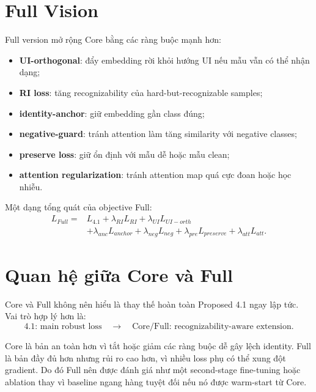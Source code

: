 \documentclass[13pt,a4paper]{extreport}
\begin{document}
\section{Full Vision}
Full version mở rộng Core bằng các ràng buộc mạnh hơn:
\begin{itemize}[leftmargin=1.2cm]
    \item \textbf{UI-orthogonal}: đẩy embedding rời khỏi hướng UI nếu mẫu vẫn có thể nhận dạng;
    \item \textbf{RI loss}: tăng recognizability của hard-but-recognizable samples;
    \item \textbf{identity-anchor}: giữ embedding gần class đúng;
    \item \textbf{negative-guard}: tránh attention làm tăng similarity với negative classes;
    \item \textbf{preserve loss}: giữ ổn định với mẫu dễ hoặc mẫu clean;
    \item \textbf{attention regularization}: tránh attention map quá cực đoan hoặc học nhiễu.
\end{itemize}

Một dạng tổng quát của objective Full:
\begin{equation}
\begin{aligned}
    L_{Full} = & L_{4.1} + \lambda_{RI}L_{RI} + \lambda_{UI}L_{UI-orth} \\
    & + \lambda_{anc}L_{anchor} + \lambda_{neg}L_{neg} + \lambda_{pre}L_{preserve} + \lambda_{att}L_{att}.
\end{aligned}
\end{equation}

\section{Quan hệ giữa Core và Full}
Core và Full không nên hiểu là thay thế hoàn toàn Proposed 4.1 ngay lập tức. Vai trò hợp lý hơn là:
\begin{equation}
    \text{4.1: main robust loss} \quad \rightarrow \quad \text{Core/Full: recognizability-aware extension}.
\end{equation}

Core là bản an toàn hơn vì tắt hoặc giảm các ràng buộc dễ gây lệch identity. Full là bản đầy đủ hơn nhưng rủi ro cao hơn, vì nhiều loss phụ có thể xung đột gradient. Do đó Full nên được đánh giá như một second-stage fine-tuning hoặc ablation thay vì baseline ngang hàng tuyệt đối nếu nó được warm-start từ Core.

\end{document}
